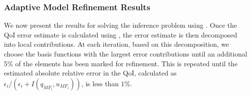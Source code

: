 \documentclass[review,sort&compress]{elsarticle}
\begin{document}
\subsubsection{Adaptive Model Refinement Results} \label{sec:cdvcdrBaseRef}
%

We now present the results for solving the inference problem using . Once the QoI error estimate is calculated using , the error estimate is then decomposed into local contributions. At each iteration, based on this decomposition, we choose the basis functions with the largest error contributions until an additional 5\% of the elements has been marked for refinement. This is repeated until the estimated absolute relative error in the QoI, calculated as $\epsilon_i/(\epsilon_i+I(q_{MF_i},u_{MF_i}))$, is less than $1\%$.
\end{document}
